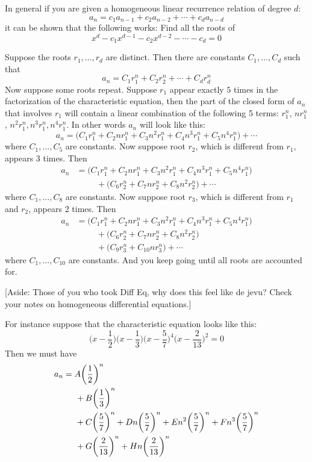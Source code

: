 In general if you are given a
homogeneous linear recurrence relation of degree $d$:
\[
a_n = c_1 a_{n-1} + c_2 a_{n-2} + \cdots + c_d a_{n - d}
\]
it can be shown that the following works:
Find all the roots of 
\[
x^d - c_1 x^{d-1} - c_2 x^{d-2} - \cdots - c_d = 0
\]
\begin{enumerate}[nosep]
\li Suppose the roots $r_1, \ldots, r_d$ are distinct.
Then there are constants $C_1, \ldots, C_d$
such that
\[
a_n = C_1 r_1^n + C_2 r_2^n + \cdots + C_d r_d^n
\]
\li
Now suppose some roots repeat.
Suppose $r_1$ appear exactly $5$ times in the factorization of the
characteristic equation, then the part of the closed form of $a_n$ 
that involves $r_1$ will contain a linear combination of
the following 5 terms:
$r_1^n$, $nr_1^n$, $n^2 r_1^n, n^3r_1^n, n^{4} r_1^n$.
In other words $a_n$ will look like this:
\[
a_n = 
\biggl( 
C_1 r_1^n + C_2nr_1^n + C_3n^2r_1^n + C_4n^3r_1^n + C_5 n^{4}r_1^n
\biggr)
+ \cdots
\]
where $C_1, ..., C_5$ are constants.
Now suppose root $r_2$, which is different from $r_1$,
appears 3 times.
Then
\begin{align*}
  a_n
  &= 
  \biggl( 
  C_1 r_1^n + C_2nr_1^n + C_3n^2r_1^n + C_4n^3r_1^n + C_5 n^{4}r_1^n
  \biggr)
  \\
  &\hspace{1cm} +
  \biggl( 
  C_6 r_2^n + C_7nr_2^n + C_8n^2r_2^n 
  \biggr)
  + \cdots
\end{align*}
where $C_1, ..., C_8$ are constants.
Now suppose root $r_3$, which is different from $r_1$ and $r_2$,
appears 2 times.
Then
\begin{align*}
  a_n
  &= 
  \biggl( 
  C_1 r_1^n + C_2nr_1^n + C_3n^2r_1^n + C_4n^3r_1^n + C_5 n^{4}r_1^n
  \biggr)
  \\
  &\hspace{1cm} +
  \biggl( 
  C_6 r_2^n + C_7nr_2^n + C_8n^2r_2^n 
  \biggr)
  \\
  &\hspace{1cm} +
  \biggl( 
  C_9 r_3^n + C_{10}nr_3^n 
  \biggr)
  + \cdots
\end{align*}
where $C_1, ..., C_{10}$ are constants.
And you keep going until all roots are accounted for.
\end{enumerate}

[Aside: Those of you who took Diff Eq, why does this feel like
de jevu? Check your notes on homogeneous differential equations.]


For instance suppose that the characteristic equation looks like this:
\[
\biggl( x - \frac{1}{2} \biggr)
\biggl( x - \frac{1}{3} \biggr)
\biggl( x - \frac{5}{7} \biggr)^4
\biggl( x - \frac{2}{13} \biggr)^2
= 0
\]
Then we must have
\begin{align*}
a_n &= 
A \biggl( \frac{1}{2} \biggr)^n \\
&\hskip 0.5cm 
+ B \biggl( \frac{1}{3} \biggr)^n \\
&\hskip 0.5cm 
+ C \biggl( \frac{5}{7} \biggr)^n +
D n\biggl( \frac{5}{7} \biggr)^n +
E n^2\biggl( \frac{5}{7} \biggr)^n +
F n^3\biggl( \frac{5}{7} \biggr)^n \\
&\hskip 0.5cm 
+ G \biggl( \frac{2}{13} \biggr)^n +
H n\biggl( \frac{2}{13} \biggr)^n
\end{align*}


